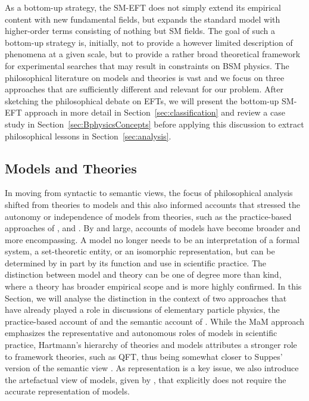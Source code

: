 As a bottom-up strategy, the SM-EFT does not simply extend its empirical content with new fundamental fields, but expands the standard model with higher-order terms consisting of nothing but SM fields.
The goal of such a bottom-up strategy is, initially, not to provide a however limited description of phenomena at a given scale, but to provide a rather broad theoretical framework for experimental searches that may result in constraints on BSM physics.
The philosophical literature on models and theories is vast and we focus on three approaches that are sufficiently different and relevant for our problem.
After sketching the philosophical debate on EFTs, we will present the bottom-up SM-EFT approach in more detail in Section~\ref{sec:classification} and review a case study in Section~\ref{sec:BphysicsConcepts} before applying this discussion to extract philosophical lessons in Section~\ref{sec:analysis}.

\subsection{Models and Theories}
\label{sub:modeltheory}

In moving from syntactic to semantic views, the focus of philosophical analysis shifted from theories to models and this also informed accounts that stressed the autonomy or independence of models from theories, such as the practice-based approaches of \citet{cartwright99}, and \citet{morganmorrison}.
By and large, accounts of models have become broader and more encompassing.
A model no longer needs to be an interpretation of a formal system, a set-theoretic entity, or an isomorphic representation, but can be determined by in part by its function and use in scientific practice.
The distinction between model and theory can be one of degree more than kind, where a theory has broader empirical scope and is more highly confirmed. 
In this Section, we will analyse the distinction in the context of two approaches that have already played a role in discussions of elementary particle physics, the practice-based account of \citet{morganmorrison} and the semantic account of \citet{hartmann1998}. 
While the MaM approach emphasizes the representative and autonomous roles of models in scientific practice, Hartmann's  hierarchy of theories and models attributes a stronger role to framework theories, such as QFT, thus being somewhat closer to Suppes' version of the semantic view \citep{suppes1962}. 
As representation is a key issue, we also introduce the artefactual view of models, given by \citet{knuuttila2011,Knuuttila2017}, that explicitly does not require the accurate representation of models. 


